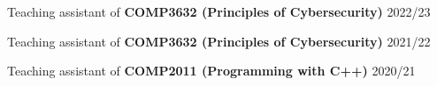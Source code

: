 Teaching assistant of \textbf{COMP3632 (Principles of Cybersecurity)} \hfill 2022/23

Teaching assistant of \textbf{COMP3632 (Principles of Cybersecurity)} \hfill 2021/22

Teaching assistant of \textbf{COMP2011 (Programming with C++)} \hfill 2020/21


